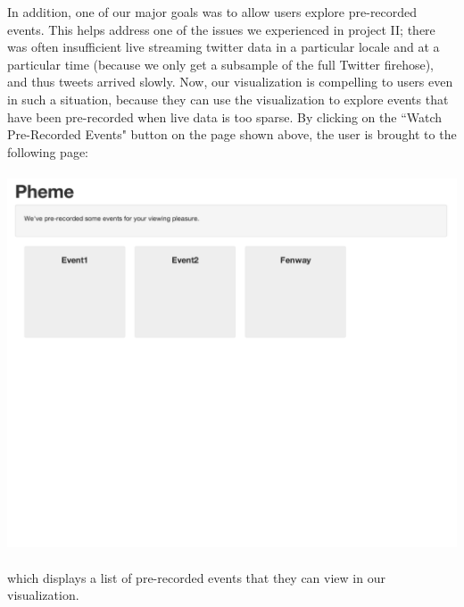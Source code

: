 \documentclass[pdftex,12pt,a4paper]{article}
\begin{document}
In addition, one of our major goals was to allow users explore pre-recorded events. This helps address one of the issues we experienced in project II; there was often insufficient live streaming twitter data in a particular locale and at a particular time (because we only get a subsample of the full Twitter firehose), and thus tweets arrived slowly. Now, our visualization is compelling to users even in such a situation, because they can use the visualization to explore events that have been pre-recorded when live data is too sparse. By clicking on the ``Watch Pre-Recorded Events" button on the page shown above, the user is brought to the following page: \\ \\
\includegraphics[width=5.5in]{splash2.png} \\ \\
which displays a list of pre-recorded events that they can view in our visualization. 
\end{document}
